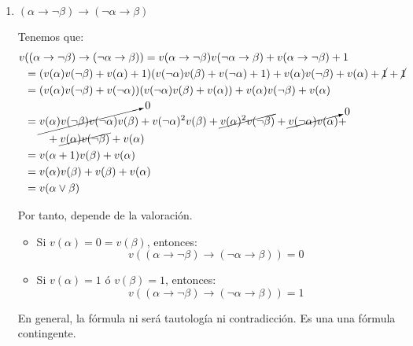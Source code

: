 \begin{ejercicio}
\begin{enumerate}
        \item $(\alpha\rightarrow\lnot\beta)\rightarrow(\lnot\alpha\rightarrow\beta)$
        
        Tenemos que:
        \begin{align*}
            v&((\alpha\rightarrow\lnot\beta)\rightarrow(\lnot\alpha\rightarrow\beta))
            = v(\alpha\rightarrow\lnot\beta)v(\lnot\alpha\rightarrow\beta)+v(\alpha\rightarrow\lnot\beta) + 1 \\
            &= (v(\alpha)v(\lnot\beta)+v(\alpha)+1)(v(\lnot\alpha)v(\beta)+v(\lnot\alpha)+1) + v(\alpha)v(\lnot\beta)+v(\alpha)+\cancel{1}+\cancel{1} \\ 
            &= (v(\alpha)v(\lnot\beta)+v(\lnot \alpha))(v(\lnot\alpha)v(\beta)+v(\alpha)) + v(\alpha)v(\lnot\beta)+v(\alpha) \\ 
            &= \cancelto{0}{v(\alpha)v(\lnot\beta)v(\lnot\alpha)v(\beta)}+v(\lnot \alpha)^2v(\beta) +\cancel{v(\alpha)^2v(\lnot\beta)}+\cancelto{0}{v(\lnot \alpha)v(\alpha)} +\\&\qquad + \cancel{v(\alpha)v(\lnot\beta)}+v(\alpha) \\ 
            &= v(\alpha+1)v(\beta) + v(\alpha)\\
            &= v(\alpha)v(\beta) + v(\beta) + v(\alpha)\\
            &= v(\alpha\lor \beta)
        \end{align*}

        Por tanto, depende de la valoración.
        \begin{itemize}
            \item Si $v(\alpha)=0=v(\beta)$, entonces:
                \begin{equation*}
                    v((\alpha\rightarrow\lnot\beta)\rightarrow(\lnot\alpha\rightarrow\beta))=0
                \end{equation*}
            \item Si $v(\alpha)=1$ ó $v(\beta)=1$, entonces:
                \begin{equation*}
                    v((\alpha\rightarrow\lnot\beta)\rightarrow(\lnot\alpha\rightarrow\beta)) = 1
                \end{equation*}
        \end{itemize}
        En general, la fórmula ni será tautología ni contradicción. Es una una fórmula contingente.

    \end{enumerate}
\end{ejercicio}


